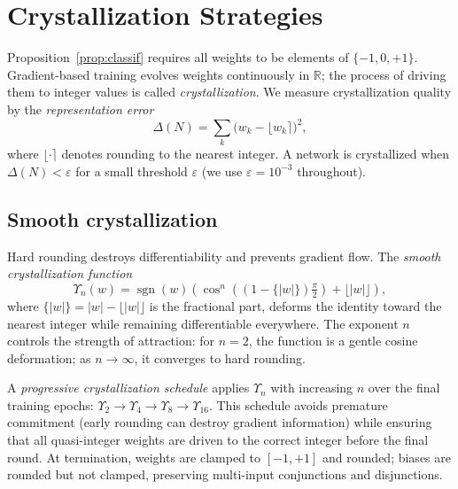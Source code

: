 \documentclass[10pt,a4paper,twoside]{article}
\begin{document}
\section{Crystallization Strategies}
\label{sec:crystal}

Proposition~\ref{prop:classif} requires all weights to be elements of
$\{-1, 0, +1\}$.
Gradient-based training evolves weights continuously in $\mathbb{R}$; the
process of driving them to integer values is called \emph{crystallization}.
We measure crystallization quality by the \emph{representation error}
\begin{equation}
  \Delta(N) = \sum_{k} \bigl(w_k - \lfloor w_k \rceil\bigr)^2,
  \label{eq:delta}
\end{equation}
where $\lfloor \cdot \rceil$ denotes rounding to the nearest integer.
A network is crystallized when $\Delta(N) < \varepsilon$ for a small
threshold $\varepsilon$ (we use $\varepsilon = 10^{-3}$ throughout).

\subsection{Smooth crystallization}
\label{ssec:smooth}

Hard rounding destroys differentiability and prevents gradient flow.
The \emph{smooth crystallization function}
\begin{equation}
  \Upsilon_n(w) = \operatorname{sgn}(w)\!\left(
    \cos^n\!\!\left((1 - \{|w|\})\tfrac{\pi}{2}\right) + \lfloor|w|\rfloor
  \right),
  \label{eq:upsilon}
\end{equation}
where $\{|w|\} = |w| - \lfloor|w|\rfloor$ is the fractional part,
deforms the identity toward the nearest integer while remaining
differentiable everywhere.
The exponent $n$ controls the strength of attraction: for $n = 2$, the
function is a gentle cosine deformation; as $n \to \infty$, it converges
to hard rounding.

A \emph{progressive crystallization schedule} applies $\Upsilon_n$ with
increasing $n$ over the final training epochs:
$\Upsilon_2 \to \Upsilon_4 \to \Upsilon_8 \to \Upsilon_{16}$.
This schedule avoids premature commitment (early rounding can destroy
gradient information) while ensuring that all quasi-integer weights are
driven to the correct integer before the final round.
At termination, weights are clamped to $[-1, +1]$ and rounded; biases
are rounded but not clamped, preserving multi-input conjunctions and
disjunctions.
\end{document}
